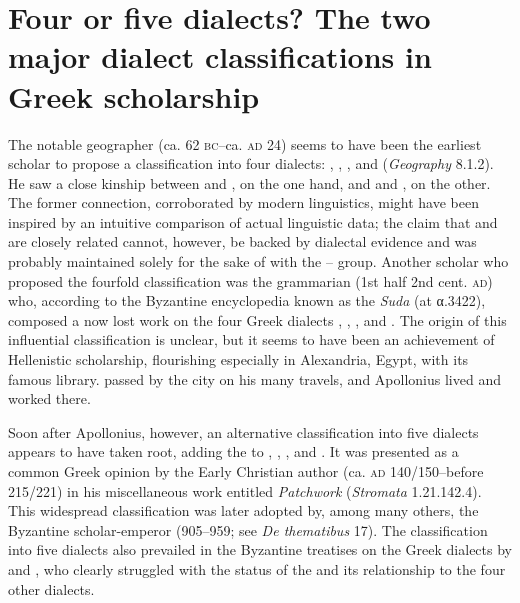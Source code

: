 \section[Four or five dialects?]{Four or five dialects? The two major dialect classifications in Greek scholarship}\label{sec:2.2}

The notable geographer  (ca. 62 \textsc{bc–}ca. \textsc{ad} 24) seems to have been the earliest scholar to propose a classification into four dialects: , , , and  (\textit{Geography} 8.1.2). He saw a close kinship between  and , on the one hand, and  and , on the other. The former connection, corroborated by modern linguistics, might have been inspired by an intuitive comparison of actual linguistic data; the claim that  and  are closely related cannot, however, be backed by dialectal evidence and was probably maintained solely for the sake of  with the – group. Another scholar who proposed the fourfold classification was the grammarian  (1st half 2nd cent. \textsc{ad}) who, according to the Byzantine encyclopedia known as the \textit{Suda} (at α.3422), composed a now lost work on the four Greek dialects , , , and . The origin of this influential classification is unclear, but it seems to have been an achievement of Hellenistic scholarship, flourishing especially in Alexandria, Egypt, with its famous library.  passed by the city on his many travels, and Apollonius lived and worked there.

Soon after Apollonius, however, an alternative classification into five dialects appears to have taken root, adding the  to , , , and . It was presented as a common Greek opinion by the Early Christian author  (ca. \textsc{ad} 140/150–before 215/221) in his miscellaneous work entitled \textit{Patchwork} (\textit{Stromata} 1.21.142.4). This widespread classification was later adopted by, among many others, the Byzantine scholar-emperor  (905–959; see \textit{De thematibus} 17). The classification into five dialects also prevailed in the Byzantine treatises on the Greek dialects by  and , who clearly struggled with the status of the  and its relationship to the four other dialects.

